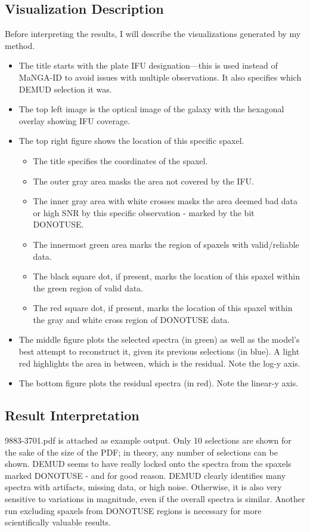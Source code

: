 \documentclass[10pt, letterpaper, notitlepage]{article}
\begin{document}
\subsection{Visualization Description}
Before interpreting the results, I will describe the visualizations generated by my method.
\begin{itemize}
	\item The title starts with the plate IFU designation---this is used instead of MaNGA-ID to avoid issues with multiple observations. It also specifies which DEMUD selection it was.
	\item The top left image is the optical image of the galaxy with the hexagonal overlay showing IFU coverage.
	\item The top right figure shows the location of this specific spaxel.
	\begin{itemize}
		\item The title specifies the coordinates of the spaxel.
		\item The outer gray area masks the area not covered by the IFU.
		\item The inner gray area with white crosses masks the area deemed bad data or high SNR by this specific observation - marked by the bit DONOTUSE.
		\item The innermost green area marks the region of spaxels with valid/reliable data.
		\item The black square dot, if present, marks the location of this spaxel within the green region of valid data.
		\item The red square dot, if present, marks the location of this spaxel within the gray and white cross region of DONOTUSE data.
	\end{itemize}
	\item The middle figure plots the selected spectra (in green) as well as the model's best attempt to reconstruct it,
	given its previous selections (in blue). A light red highlights the area in between, which is the residual. Note the log-y axis.
	\item The bottom figure plots the residual spectra (in red). Note the linear-y axis.
\end{itemize}

\subsection{Result Interpretation}
9883-3701.pdf is attached as example output. Only 10 selections are shown for the sake of the size of the PDF; in theory,
any number of selections can be shown. DEMUD seems to have really locked onto the spectra from the spaxels marked
DONOTUSE - and for good reason. DEMUD clearly identifies many spectra with artifacts, missing data, or high noise.
Otherwise, it is also very sensitive to variations in magnitude, even if the overall spectra is similar. Another run
excluding spaxels from DONOTUSE regions is necessary for more scientifically valuable results.
\end{document}
